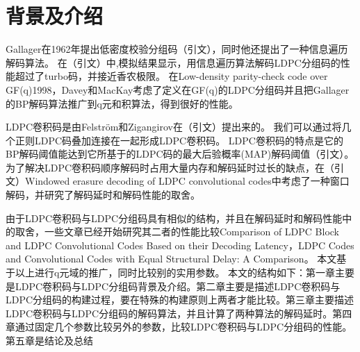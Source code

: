 \chapter{背景及介绍}
Gallager在1962年提出低密度校验分组码（引文），同时他还提出了一种信息遍历解码算法。
在（引文）中,模拟结果显示，用信息遍历算法解码LDPC分组码的性能超过了turbo码，并接近香农极限。
在Low-density parity-check code over GF(q)1998，Davey和MacKay考虑了定义在GF(q)的LDPC分组码并且把Gallager的BP解码算法推广到q元和积算法，得到很好的性能。

LDPC卷积码是由Felström和Zigangirov在（引文）提出来的。
我们可以通过将几个正则LDPC码叠加连接在一起形成LDPC卷积码。
LDPC卷积码的特点是它的BP解码阈值能达到它所基于的LDPC码的最大后验概率(MAP)解码阈值（引文）。
为了解决LDPC卷积码顺序解码时占用大量内存和解码延时过长的缺点，在（引文）Windowed erasure decoding of LDPC convolutional codes中考虑了一种窗口解码，并研究了解码延时和解码性能的取舍。

由于LDPC卷积码与LDPC分组码具有相似的结构，并且在解码延时和解码性能中的取舍，一些文章已经开始研究其二者的性能比较Comparison of LDPC Block and LDPC Convolutional Codes Based on their Decoding Latency，LDPC Codes and Convolutional Codes with Equal Structural Delay: A Comparison。
本文基于以上进行q元域的推广，同时比较别的实用参数。
本文的结构如下：第一章主要是LDPC卷积码与LDPC分组码背景及介绍。第二章主要是描述LDPC卷积码与LDPC分组码的构建过程，要在特殊的构建原则上两者才能比较。第三章主要描述LDPC卷积码与LDPC分组码的解码算法，并且计算了两种算法的解码延时。第四章通过固定几个参数比较另外的参数，比较LDPC卷积码与LDPC分组码的性能。第五章是结论及总结